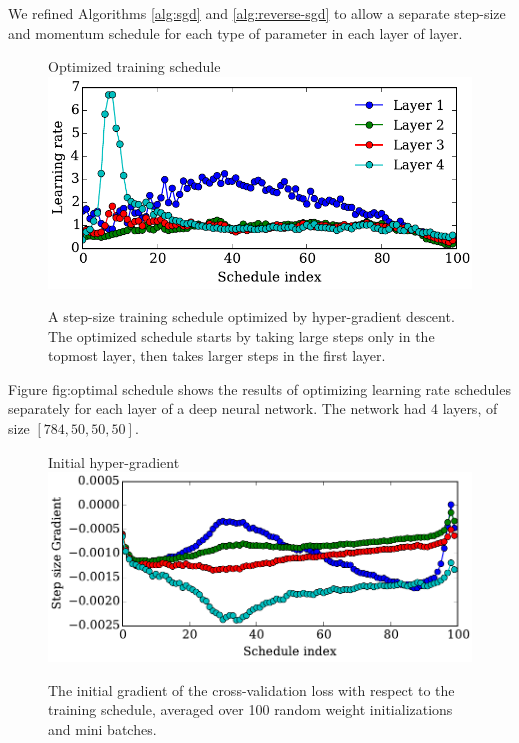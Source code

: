 \documentclass{article}
\begin{document}
We refined Algorithms \ref{alg:sgd} and \ref{alg:reverse-sgd} to allow a separate step-size and momentum schedule for each type of parameter in each layer of layer.
%
\begin{figure}[h!]
\vskip 0.2in
\begin{center}
Optimized training schedule \\
\includegraphics[width=\columnwidth]{../experiments/Feb_3_training_schedules/3_adam_50/schedules_small.pdf}
\caption{A step-size training schedule optimized by hyper-gradient descent.
The optimized schedule starts by taking large steps only in the topmost layer, then takes larger steps in the first layer.}
\label{fig:optimal schedule}
\end{center}
\vskip -0.2in
\end{figure} 
%
Figure {fig:optimal schedule} shows the results of optimizing learning rate schedules separately for each layer of a deep neural network.
The network had 4 layers, of size $[784, 50, 50, 50]$.

\begin{figure}[h!]
\vskip 0.2in
\begin{center}
Initial hyper-gradient\\
\includegraphics[width=\columnwidth]{../experiments/Feb_3_training_schedules/5_initial_gradient/schedules_small.pdf}
\caption{The initial gradient of the cross-validation loss with respect to the training schedule, averaged over 100 random weight initializations and mini batches.}
\label{fig:optimal schedule}
\end{center}
\vskip -0.2in
\end{figure} 
\end{document}
